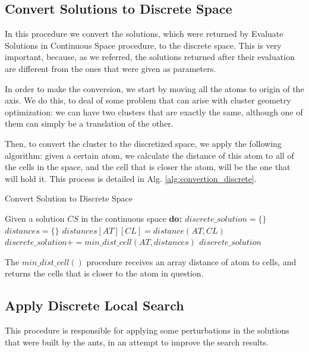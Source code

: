 			\subsection{Convert Solutions to Discrete Space}
			In this procedure we convert the solutions, which were returned by Evaluate Solutions in Continuous Space procedure, to the discrete space. This is very important, because, as we referred, the solutions returned after their evaluation are different from the ones that were given as parameters.

			In order to make the conversion, we start by moving all the atoms to origin of the axis. We do this, to deal of some problem that can arise with cluster geometry optimization: we can have two clusters that are exactly the same, although one of them can simply be a translation of the other.

			Then, to convert the cluster to the discretized space, we apply the following algorithm: given a certain atom, we calculate the distance of this atom to all of the cells in the space, and the cell that is closer the atom, will be the one that will hold it. This process is detailed in Alg. \ref{alg:convertion_discrete}.
			
			\begin{algorithm}
				\caption{Convert Solution to Discrete Space}
				\label{alg:convertion_discrete}
				\begin{algorithmic}
				\STATE Given a solution $CS$ in the continuous space \bf{do}:
				\STATE $discrete\_solution = \{\}$
						\STATE $distances = \{\}$
								\STATE $distances[AT][CL] = distance(AT, CL)$
						\ENDFOR
						\STATE $discrete\_solution += min\_dist\_cell(AT, distances)$
				\ENDFOR
				\RETURN $discrete\_solution$
				\end{algorithmic}
			\end{algorithm}
			
			The $min\_dist\_cell()$ procedure receives an array distance of atom to cells, and returns the cells that is closer to the atom in question.
			
			\subsection{Apply Discrete Local Search}
			This procedure is responsible for applying some perturbations in the solutions that were built by the ants, in an attempt to improve the search results.

